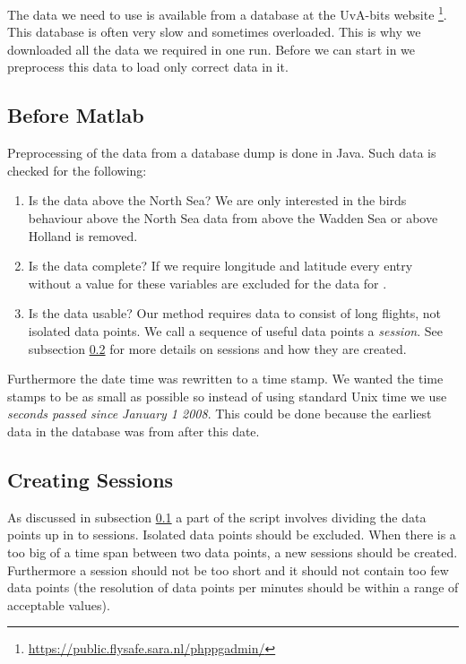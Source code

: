 The data we need to use is available from a database at the UvA-bits website
\footnote{\url{https://public.flysafe.sara.nl/phppgadmin/} }. This database is often very slow 
and sometimes overloaded. This is why we downloaded all the data we required in one run. 
Before we can start in \matlab we preprocess this data to load only correct data
in it.

\subsection{Before Matlab}
\label{subsec:beforeMatlab}
Preprocessing of the data from a database dump is done in Java. Such data 
is checked for the following: 
\begin{enumerate}
    \item Is the data above the North Sea? We are only interested in the birds behaviour 
    above the North Sea data from above the Wadden Sea or above Holland is removed.
    \item Is the data complete? If we require longitude and latitude every entry 
    without a value for these variables are excluded for the data for \matlab. 
    \item Is the data usable? Our method requires data to consist of long flights,
    not isolated data points. We call a sequence of useful data points a \textit{session}. 
    See subsection \ref{subsec:creatingSessions} for more details on sessions and how
    they are created.
\end{enumerate}

Furthermore the date time was rewritten to a time stamp. We wanted the time stamps to be 
as small as possible so instead of using standard Unix time we use \textit{seconds passed
since 
January 1 2008}. This could be done because the earliest data in the database was from after
this date. 

\subsection{Creating Sessions}
\label{subsec:creatingSessions}
As discussed in subsection \ref{subsec:beforeMatlab} a part of the script involves 
dividing the data points up in to sessions. Isolated data points should be excluded. 
When there is a too big of a time span between two data points, a new sessions should be 
created. Furthermore a session should not be too short and it should not contain too few
data points (the resolution of data points per minutes should be within a range of 
acceptable values). 

